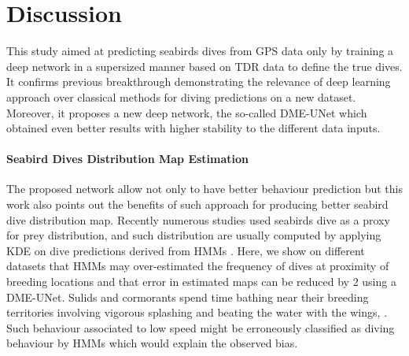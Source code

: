 \documentclass{article}
\begin{document}
\section{Discussion}

This study aimed at predicting seabirds dives from GPS data only by training a deep network in a supersized manner based on TDR data to define the true dives.
It confirms previous breakthrough \cite{browning_predicting_2018} demonstrating the relevance of deep learning approach over classical methods for diving predictions on a new dataset.
Moreover, it proposes a new deep network, the so-called DME-UNet which obtained even better results with higher stability to the different data inputs.

\paragraph{Seabird Dives Distribution Map Estimation}
The proposed network allow not only to have better behaviour prediction but this work also points out the benefits of such approach for producing better seabird dive distribution map.
Recently numerous studies used seabirds dive as a proxy for prey distribution, and such distribution are usually computed by applying KDE on dive predictions derived from HMMs \cite{delord_movements_2020,weimerskirch_at-sea_2020,zhang_gps_2019}.
Here, we show on different datasets that HMMs may over-estimated the frequency of dives at proximity of breeding locations and that error in estimated maps can be reduced by 2 using a DME-UNet.
Sulids and cormorants  spend  time  bathing  near their breeding territories involving vigorous splashing and beating the water with the wings, \cite{nelson_pelicans_2005}. Such behaviour associated to low speed might be erroneously classified as diving behaviour by HMMs which would explain the observed bias.
\end{document}
